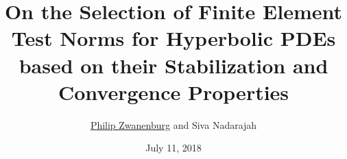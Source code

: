 \title[{\color{white} Test Norms for Hyperbolic PDEs - Stabilization and Convergence}]{On the Selection of Finite Element Test Norms for Hyperbolic PDEs based on their Stabilization and Convergence Properties}

\author[P. Zwanenburg and S. Nadarajah]{\underline{Philip Zwanenburg} and Siva Nadarajah}
\date{July 11, 2018}

